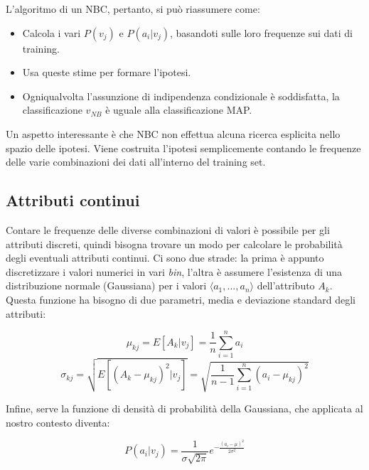 L'algoritmo di un NBC, pertanto, si può riassumere come:
\begin{itemize}
	\item Calcola i vari $P(v_j)$ e $P(a_i|v_j)$, basandoti sulle loro frequenze sui dati di training.
	\item Usa queste stime per formare l'ipotesi.
	\item Ogniqualvolta l'assunzione di indipendenza condizionale è soddisfatta, la classificazione $v_{NB}$ è uguale alla classificazione MAP.
\end{itemize}

Un aspetto interessante è che NBC non effettua alcuna ricerca esplicita nello spazio delle ipotesi. Viene costruita l'ipotesi semplicemente contando le frequenze delle varie combinazioni dei dati all'interno del training set.

\subsection*{Attributi continui}
Contare le frequenze delle diverse combinazioni di valori è possibile per gli attributi discreti, quindi bisogna trovare un modo per calcolare le probabilità degli eventuali attributi continui. Ci sono due strade: la prima è appunto discretizzare i valori numerici in vari \emph{bin}, l'altra è assumere l'esistenza di una distribuzione normale (Gaussiana) per i valori $\langle a_1, ..., a_n \rangle$ dell'attributo $A_k$. Questa funzione ha bisogno di due parametri, media e deviazione standard degli attributi:

$$ \mu_{kj} = E[A_k | v_j] = \frac{1}{n} \sum_{i = 1}^{n} a_i$$
$$ \sigma_{kj} = \sqrt{ E[(A_k - \mu_{kj})^2 | v_j] } = \sqrt{ \frac{1}{n-1} \sum_{i = 1}^{n} (a_i - \mu_{kj})^2 } $$

Infine, serve la funzione di densità di probabilità della Gaussiana, che applicata al nostro contesto diventa:

$$ P(a_i | v_j) = \frac{1}{\sigma\sqrt{2\pi}} e^{-\frac{(a_i-\mu)^2}{2\sigma^2}} $$

